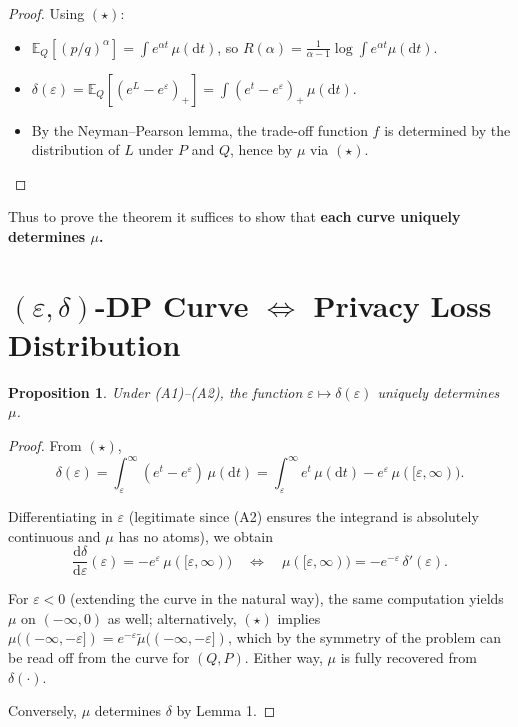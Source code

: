 \documentclass[11pt]{article}
\newtheorem{proposition}{Proposition}
\begin{document}
\begin{proof}
Using $(\star)$:
\begin{itemize}
    \item $\mathbb{E}_Q[(p/q)^\alpha] = \int e^{\alpha t}\,\mu(\mathrm{d}t)$, so $R(\alpha) = \frac{1}{\alpha-1}\log \int e^{\alpha t}\mu(\mathrm{d}t)$.
    \item $\delta(\varepsilon) = \mathbb{E}_Q[(e^L - e^\varepsilon)_+] = \int (e^t - e^\varepsilon)_+\,\mu(\mathrm{d}t)$.
    \item By the Neyman--Pearson lemma, the trade-off function $f$ is determined by the distribution of $L$ under $P$ and $Q$, hence by $\mu$ via $(\star)$. \qedhere
\end{itemize}
\end{proof}

Thus to prove the theorem it suffices to show that \textbf{each curve uniquely determines $\mu$.}

\section{$(\varepsilon,\delta)$-DP Curve $\Leftrightarrow$ Privacy Loss Distribution}

\begin{proposition}
Under (A1)--(A2), the function $\varepsilon \mapsto \delta(\varepsilon)$ uniquely determines $\mu$.
\end{proposition}

\begin{proof}
From $(\star)$,
\[
\delta(\varepsilon) = \int_\varepsilon^\infty (e^t - e^\varepsilon)\,\mu(\mathrm{d}t) = \int_\varepsilon^\infty e^t\,\mu(\mathrm{d}t) - e^\varepsilon\, \mu([\varepsilon,\infty)).
\]

Differentiating in $\varepsilon$ (legitimate since (A2) ensures the integrand is absolutely continuous and $\mu$ has no atoms), we obtain
\[
\frac{\mathrm{d}\delta}{\mathrm{d}\varepsilon}(\varepsilon) = -e^\varepsilon\,\mu([\varepsilon,\infty)) \quad\Longleftrightarrow\quad \mu([\varepsilon,\infty)) = -e^{-\varepsilon}\,\delta'(\varepsilon).
\]

For $\varepsilon < 0$ (extending the curve in the natural way), the same computation yields $\mu$ on $(-\infty,0)$ as well; alternatively, $(\star)$ implies $\mu((-\infty,-\varepsilon]) = e^{-\varepsilon}\tilde\mu((-\infty,-\varepsilon])$, which by the symmetry of the problem can be read off from the curve for $(Q,P)$. Either way, $\mu$ is fully recovered from $\delta(\cdot)$.

Conversely, $\mu$ determines $\delta$ by Lemma 1.
\end{proof}
\end{document}
